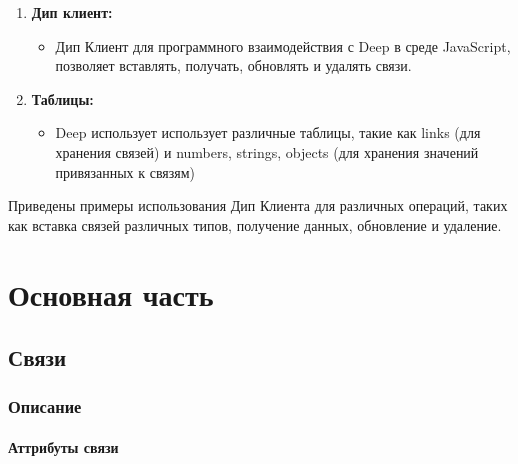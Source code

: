 \documentclass{article}
\begin{document}
\begin{enumerate}
      \item \textbf{Дип клиент:}
            \begin{itemize}
                  \item Дип Клиент для программного взаимодействия с Deep в
                        среде
                        JavaScript, позволяет вставлять, получать, обновлять и
                        удалять
                        связи.
            \end{itemize}

      \item \textbf{Таблицы:}
            \begin{itemize}
                  \item Deep использует использует различные таблицы, такие как
                        links
                        (для хранения связей) и numbers, strings, objects (для
                        хранения
                        значений
                        привязанных к связям)
            \end{itemize}
\end{enumerate}

Приведены примеры использования Дип Клиента для различных операций, таких как
вставка связей различных типов, получение данных, обновление и удаление.


\tableofcontents

\section{Основная часть}

\subsection{Связи}

\subsubsection{Описание}

\paragraph{Аттрибуты связи}
\end{document}
